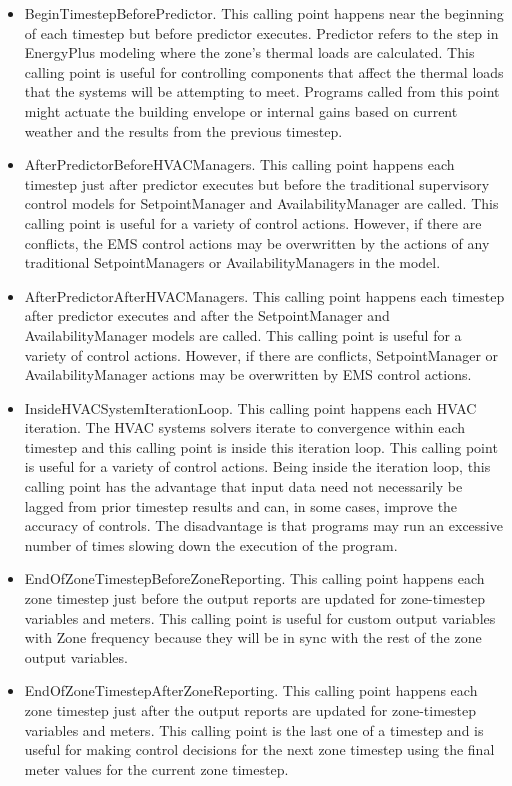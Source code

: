 \begin{itemize}
\item
  BeginTimestepBeforePredictor. This calling point happens near the beginning of each timestep but before predictor executes. Predictor refers to the step in EnergyPlus modeling where the zone's thermal loads are calculated. This calling point is useful for controlling components that affect the thermal loads that the systems will be attempting to meet. Programs called from this point might actuate the building envelope or internal gains based on current weather and the results from the previous timestep.
\item
  AfterPredictorBeforeHVACManagers. This calling point happens each timestep just after predictor executes but before the traditional supervisory control models for SetpointManager and AvailabilityManager are called. This calling point is useful for a variety of control actions. However, if there are conflicts, the EMS control actions may be overwritten by the actions of any traditional SetpointManagers or AvailabilityManagers in the model.
\item
  AfterPredictorAfterHVACManagers. This calling point happens each timestep after predictor executes and after the SetpointManager and AvailabilityManager models are called. This calling point is useful for a variety of control actions. However, if there are conflicts, SetpointManager or AvailabilityManager actions may be overwritten by EMS control actions.
\item
  InsideHVACSystemIterationLoop. This calling point happens each HVAC iteration. The HVAC systems solvers iterate to convergence within each timestep and this calling point is inside this iteration loop. This calling point is useful for a variety of control actions. Being inside the iteration loop, this calling point has the advantage that input data need not necessarily be lagged from prior timestep results and can, in some cases, improve the accuracy of controls. The disadvantage is that programs may run an excessive number of times slowing down the execution of the program.
\item
  EndOfZoneTimestepBeforeZoneReporting. This calling point happens each zone timestep just before the output reports are updated for zone-timestep variables and meters. This calling point is useful for custom output variables with Zone frequency because they will be in sync with the rest of the zone output variables.
\item
  EndOfZoneTimestepAfterZoneReporting. This calling point happens each zone timestep just after the output reports are updated for zone-timestep variables and meters. This calling point is the last one of a timestep and is useful for making control decisions for the next zone timestep using the final meter values for the current zone timestep.

\end{itemize}
